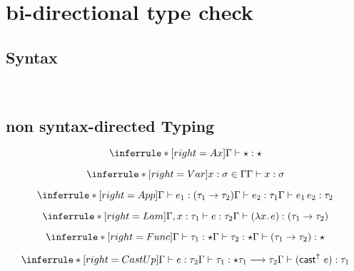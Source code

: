 \section{bi-directional type check}

\subsection{Syntax}
\gram{\otte\ottinterrule
      \ottS\ottinterrule
  }
\\[2.0mm]


\subsection{non syntax-directed Typing}

\newcommand{\pgm}{\mathsf{P}}
\newcommand{\nat}{\mathsf{nat}}
\newcommand{\logic}{\mathsf{L}}
\newcommand{\judge}{\Gamma\vdash}
\newcommand{\checktype}{\Gamma\vdash^\leftarrow}
\newcommand{\infertype}{\Gamma\vdash^\rightarrow}
\newcommand{\checktypeno}{\vdash^\leftarrow}
\newcommand{\infertypeno}{\vdash^\rightarrow}


\framebox{$ \judge e : \sigma$ }

\[
\inferrule*[right=Ax]
{} {\judge \star : \star}
\]

\[
\inferrule*[right=Var]
{x : \sigma \in \Gamma} {\judge x : \sigma}
\]


\[
\inferrule*[right=App]
{\judge e_1 : (\tau_1 \rightarrow \tau_2) \\ \judge e_2 : \tau_1} {\judge e_1\,e_2 : \tau_2}
\]

\[
\inferrule*[right=Lam]
{\Gamma,x: \tau_1 \vdash e : \tau_2 } {\judge (\lambda x.\, e) : (\tau_1 \rightarrow \tau_2)}
\]

\[
\inferrule*[right=Func]
{\judge \tau_1 : \star \\ \judge \tau_2 : \star} {\judge (\tau_1 \rightarrow \tau_2) : \star}
\]

\[
\inferrule*[right=CastUp]
{\judge e : \tau_2 \\ \judge \tau_1 : \star \\ \tau_1 \longrightarrow \tau_2} {\judge (\mathsf{cast}^\uparrow\ e) : \tau_1}
\]

